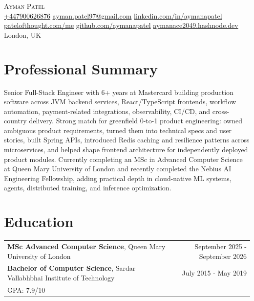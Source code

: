 \documentclass[10pt,a4paper]{article}
\begin{document}
\fontsize{8.85}{10.0}\selectfont
\color{bodycolor}

\begin{center}
{\Huge\scshape Ayman Patel}\\[3pt]
\href{tel:+447900626876}{+447900626876} \textbar{}
\href{mailto:ayman.patel97@gmail.com}{ayman.patel97@gmail.com} \textbar{}
\href{https://linkedin.com/in/aymanapatel}{linkedin.com/in/aymanapatel} \textbar{}
\href{https://patelofthought.com/me}{patelofthought.com/me} \textbar{}
\href{https://github.com/aymanapatel}{github.com/aymanapatel} \textbar{}
\href{https://aymanace2049.hashnode.dev}{aymanace2049.hashnode.dev} \textbar{}
London, UK
\end{center}

\section*{Professional Summary}
Senior Full-Stack Engineer with 6+ years at Mastercard building production software across JVM backend services, React/TypeScript frontends, workflow automation, payment-related integrations, observability, CI/CD, and cross-country delivery. Strong match for greenfield 0-to-1 product engineering: owned ambiguous product requirements, turned them into technical specs and user stories, built Spring APIs, introduced Redis caching and resilience patterns across microservices, and helped shape frontend architecture for independently deployed product modules. Currently completing an MSc in Advanced Computer Science at Queen Mary University of London and recently completed the Nebius AI Engineering Fellowship, adding practical depth in cloud-native ML systems, agents, distributed training, and inference optimization.

\section*{Education}
\begin{tabularx}{\textwidth}{@{}Xr@{}}
\textbf{MSc Advanced Computer Science}, Queen Mary University of London & September 2025 - September 2026\\
\textbf{Bachelor of Computer Science}, Sardar Vallabhbhai Institute of Technology & July 2015 - May 2019\\
GPA: 7.9/10 &
\end{tabularx}
\end{document}
